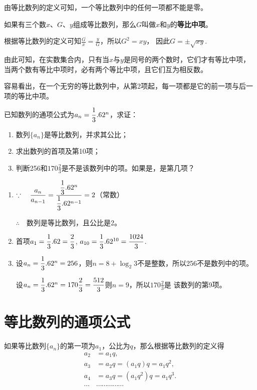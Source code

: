 由等比数列的定义可知，一个等比数列中的任何一项都不能是零。

如果有三个数$x$、$G$、$y$组成等比数列，那么$G$叫做$x$和$y$的\textbf{等比中项}。

根据等比数列的定义可知$\frac{G}{x}=\frac{y}{G}$，所以$G^2=xy$，
因此$G=\pm\sqrt{xy}$.

由此可知，在实数集合内，只有当$x$与$y$是同号的两个数时，它们才有等比中项，当两个数有等比中项时，必有两个等比中项，且它们互为相反数。

容易看出，在一个无穷的等比数列中，从第2项起，每一项都是它的前一项与后一项的等比中项。


\begin{example}
已知数列的通项公式为$a_n=\dfrac{1}{3}.6 2^n$，求证：
\begin{enumerate}[(1)]
\item 数列$\{a_n\}$是等比数列，并求其公比；
\item 求出数列的首项及第10项；
\item 判断256和$170\frac{2}{3}$是不是该数列中的项。如果是，是第几项？
\end{enumerate}
\end{example}

\begin{solution}
\begin{enumerate}[(1)]
    \item $\because\quad \dfrac{a_n}{a_{n-1}}=\dfrac{\dfrac{1}{3}.6 2^n}{\dfrac{1}{3}.6 2^{n-1}}=2$（常数）
    
$\therefore\quad $数列是等比数列，且公比是2。
\item 首项$a_1=\dfrac{1}{3}.62=\dfrac{2}{3}$, $a_{10}=\dfrac{1}{3}.62^{10}=\dfrac{1024}{3}$.
\item 设$a_n=\dfrac{1}{3}.62^n=256$，则$n=8+\log_2 3$不是整数，所以256不是数列中的项。

设$a_n=\dfrac{1}{3}.62^n=170\dfrac{2}{3}=\dfrac{512}{3}$则$n=9$，所以$170\frac{2}{3}$是
该数列的第9项。
\end{enumerate}
\end{solution}


\section{等比数列的通项公式}
如果等比数列$\{a_n\}$的第一项为$a_1$，公比为$q$，那么根据等比数列的定义得
\[\begin{split}
  a_2&=a_1q,\\
a_3&=a_2q=(a_1q)q=a_1q^2,\\
a_4&=a_3q=(a_1q^2)q=a_1q^3.\\  
\cdots &\cdots \cdots \cdots \cdots \cdots 
\end{split}\]

